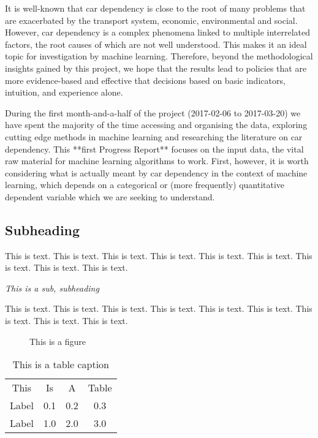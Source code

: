 \documentclass[11pt]{article}
\begin{document}
It is well-known that car dependency is close to the root of many problems that are exacerbated by the transport system, economic, environmental and social. However, car dependency is a complex phenomena linked to multiple interrelated factors, the root causes of which are not well understood. This makes it an ideal topic for investigation by machine learning. Therefore, beyond the methodological insights gained by this project, we hope that the results lead to policies that are more evidence-based and effective that decisions based on basic indicators, intuition, and experience alone.

During the first month-and-a-half of the project (2017-02-06 to 2017-03-20) we have spent the majority of the time accessing and organising the data, exploring cutting edge methods in machine learning and researching the literature on car dependency. This **first Progress Report** focuses on the input data, the vital raw material for machine learning algorithms to work. First, however, it is worth considering what is actually meant by car dependency in the context of machine learning, which depends on a categorical or (more frequently) quantitative dependent variable which we are seeking to understand.


\subsection{Subheading}

This is text. This is text. This is text. This is text. This is text. This is text. This is text. This is text. This is text.


\hfill \break
\itshape{This is a sub, subheading}\normalfont

\hfill\break
This is text. This is text. This is text. This is text. This is text. This is text. This is text. This is text. This is text.


\begin{figure}[htbp] \begin{center} 
 \caption{This is a figure} \label{first_figure} \end{center} \end{figure} %




\begin{table}[htp]

\begin{center}
\begin{tabular}{c c c c}
\arrayrulecolor{black}
\hline 
This & Is & A & Table\\
\arrayrulecolor{lightgray}
\hline 
\arrayrulecolor{black}
Label & 0.1 & 0.2 & 0.3\\
Label & 1.0 & 2.0 & 3.0\\
\hline
\end{tabular}
\end{center}
\label{first_table}
\caption{This is a table caption}
\end{table}%
\end{document}
